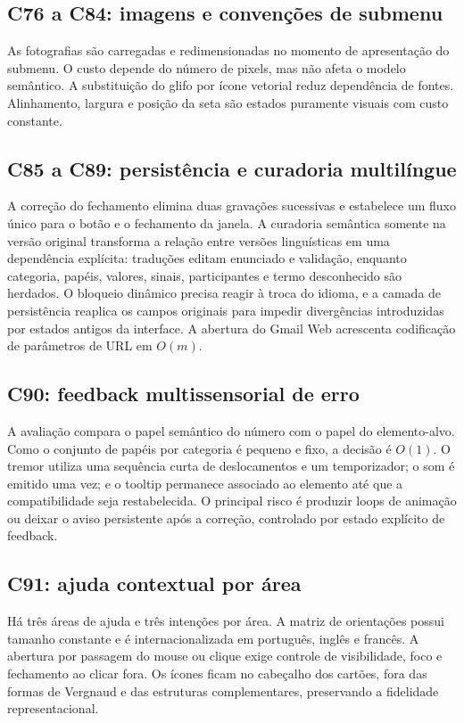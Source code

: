 \documentclass[12pt,a4paper]{article}
\begin{document}
\subsection{C76 a C84: imagens e convenções de submenu}
As fotografias são carregadas e redimensionadas no momento de apresentação do submenu. O custo depende do número de pixels, mas não afeta o modelo semântico. A substituição do glifo por ícone vetorial reduz dependência de fontes. Alinhamento, largura e posição da seta são estados puramente visuais com custo constante.

\subsection{C85 a C89: persistência e curadoria multilíngue}
A correção do fechamento elimina duas gravações sucessivas e estabelece um fluxo único para o botão e o fechamento da janela. A curadoria semântica somente na versão original transforma a relação entre versões linguísticas em uma dependência explícita: traduções editam enunciado e validação, enquanto categoria, papéis, valores, sinais, participantes e termo desconhecido são herdados. O bloqueio dinâmico precisa reagir à troca do idioma, e a camada de persistência reaplica os campos originais para impedir divergências introduzidas por estados antigos da interface. A abertura do Gmail Web acrescenta codificação de parâmetros de URL em $O(m)$.

\subsection{C90: feedback multissensorial de erro}
A avaliação compara o papel semântico do número com o papel do elemento-alvo. Como o conjunto de papéis por categoria é pequeno e fixo, a decisão é $O(1)$. O tremor utiliza uma sequência curta de deslocamentos e um temporizador; o som é emitido uma vez; e o tooltip permanece associado ao elemento até que a compatibilidade seja restabelecida. O principal risco é produzir loops de animação ou deixar o aviso persistente após a correção, controlado por estado explícito de feedback.

\subsection{C91: ajuda contextual por área}
Há três áreas de ajuda e três intenções por área. A matriz de orientações possui tamanho constante e é internacionalizada em português, inglês e francês. A abertura por passagem do mouse ou clique exige controle de visibilidade, foco e fechamento ao clicar fora. Os ícones ficam no cabeçalho dos cartões, fora das formas de Vergnaud e das estruturas complementares, preservando a fidelidade representacional.
\end{document}
